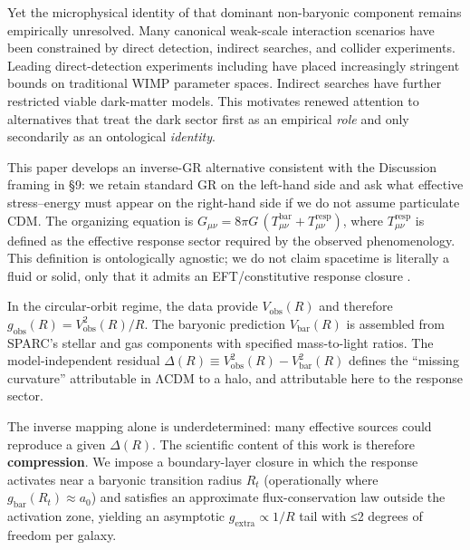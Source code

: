 \documentclass[11pt]{article}
\begin{document}
Yet the microphysical identity of that dominant non-baryonic component remains empirically unresolved. Many canonical weak-scale interaction scenarios have been constrained by direct detection, indirect searches, and collider experiments. Leading direct-detection experiments including \citep{Akerib2017LUX, Aprile2018XENON1T, Cui2017PandaX} have placed increasingly stringent bounds on traditional WIMP parameter spaces. Indirect searches \citep{Aguilar2013AMS} have further restricted viable dark-matter models. This motivates renewed attention to alternatives that treat the dark sector first as an empirical \emph{role} and only secondarily as an ontological \emph{identity}.

This paper develops an inverse-GR alternative consistent with the Discussion framing in §9: we retain standard GR \citep{Einstein1916GR, Wald1984GR} on the left-hand side and ask what effective stress--energy must appear on the right-hand side if we do not assume particulate CDM. The organizing equation is \(G_{\mu\nu} = 8\pi G\,\left( T_{\mu\nu}^{\text{bar}} + T_{\mu\nu}^{\text{resp}} \right)\), where \(T_{\mu\nu}^{\text{resp}}\) is defined as the effective response sector required by the observed phenomenology. This definition is ontologically agnostic; we do not claim spacetime is literally a fluid or solid, only that it admits an EFT/constitutive response closure \citep{Carroll2004Spacetime, Carroll2019Spacetime}.

In the circular-orbit regime, the data provide \(V_{\text{obs}}(R)\) and therefore \(g_{\text{obs}}(R) = V_{\text{obs}}^{2}(R)\text{/}R\). The baryonic prediction \(V_{\text{bar}}(R)\) is assembled from SPARC's stellar and gas components with specified mass-to-light ratios. The model-independent residual \(\Delta(R) \equiv V_{\text{obs}}^{2}(R) - V_{\text{bar}}^{2}(R)\) defines the ``missing curvature'' attributable in ΛCDM to a halo, and attributable here to the response sector.

The inverse mapping alone is underdetermined: many effective sources could reproduce a given \(\Delta(R)\). The scientific content of this work is therefore \textbf{compression}. We impose a boundary-layer closure in which the response activates near a baryonic transition radius \(R_{t}\) (operationally where \(g_{\text{bar}}\left( R_{t} \right) \approx a_{0}\)) and satisfies an approximate flux-conservation law outside the activation zone, yielding an asymptotic \(g_{\text{extra}} \propto 1\text{/}R\) tail with ≤2 degrees of freedom per galaxy.
\end{document}
